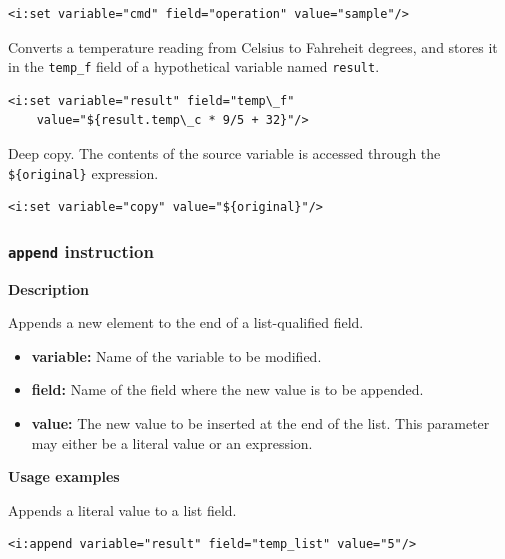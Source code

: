 \lstset{language=XML}
\begin{lstlisting}
<i:set variable="cmd" field="operation" value="sample"/>
\end{lstlisting}

Converts a temperature reading from Celsius to Fahreheit degrees, and stores it
in the \texttt{temp\_f} field of a hypothetical variable named \texttt{result}.

\lstset{language=XML}
\begin{lstlisting}
<i:set variable="result" field="temp\_f"
    value="${result.temp\_c * 9/5 + 32}"/>
\end{lstlisting}

Deep copy. The contents of the source variable is accessed through the
\lstinline!${original}! expression.

\lstset{language=XML}
\begin{lstlisting}
<i:set variable="copy" value="${original}"/>
\end{lstlisting}


\subsubsection{\texttt{append} instruction}

\textbf{Description}

Appends a new element to the end of a list-qualified field.

\begin{itemize}

    \item \textbf{variable:} Name of the variable to be modified.
    
    \item \textbf{field:} Name of the field where the new value is to be
        appended.

    \item \textbf{value:} The new value to be inserted at the end of the list.
        This parameter may either be a literal value or an expression.

\end{itemize}

\textbf{Usage examples}

Appends a literal value to a list field.

\lstset{language=XML}
\begin{lstlisting}
<i:append variable="result" field="temp_list" value="5"/>
\end{lstlisting}


